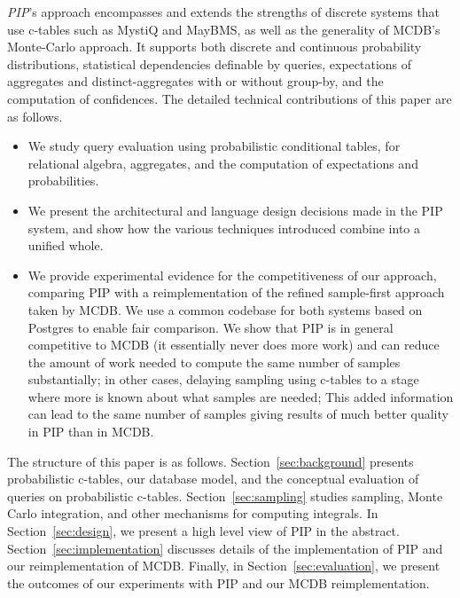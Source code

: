 {\em PIP}\/'s approach encompasses and extends the strengths of discrete systems that use c-tables such as MystiQ and MayBMS, as well as the generality of MCDB's Monte-Carlo approach.  It supports both discrete and continuous probability distributions, statistical dependencies definable by queries, expectations of aggregates and distinct-aggregates with or without  group-by,  and the computation of confidences. The detailed technical contributions of this paper are as follows.


\begin{itemize}
\addtolength{\topsep}{-0.3ex}
\addtolength{\labelsep}{-0.3ex}
\addtolength{\itemsep}{-1ex}
\item
We study query evaluation using probabilistic conditional tables, for
relational algebra, aggregates, and the computation of expectations and
probabilities.

\item
We present the architectural and language design decisions made in the
PIP system, and show how the various techniques introduced combine into
a unified whole.

\item
We provide experimental evidence for the competitiveness of our approach, comparing PIP with a reimplementation of the refined sample-first approach taken by MCDB.  We use a common codebase for both systems based on Postgres to enable fair comparison. We show that PIP is in general competitive to MCDB (it essentially never does more work) and can reduce the amount of work needed to compute the same number of samples substantially; in other cases, delaying sampling using c-tables to a stage where more is known about what samples are needed; This added information can lead to the same number of samples giving results of much better quality in PIP than in MCDB.
\end{itemize}

The structure of this paper is as follows. Section~\ref{sec:background} presents probabilistic c-tables, our database model, and the conceptual  evaluation of queries on probabilistic c-tables. Section~\ref{sec:sampling} studies sampling, Monte
Carlo integration, and other mechanisms for computing integrals.  In Section~\ref{sec:design}, we present a high level view of PIP in the abstract.   Section~\ref{sec:implementation} discusses details of the implementation of PIP and our reimplementation of MCDB.  Finally, in Section~\ref{sec:evaluation}, we present the outcomes of our experiments with PIP and our MCDB reimplementation.